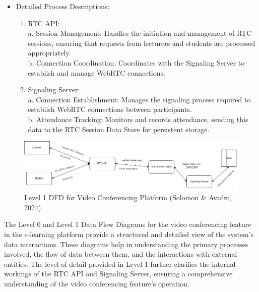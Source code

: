 \documentclass[a4paper,12pt]{article}  %
\begin{document}
\begin{itemize}
\begin{enumerate}
            \end{enumerate}
      \item Detailed Process Descriptions:\\
            \begin{enumerate}
                  \item RTC API:\\
                        a. Session Management: Handles the initiation and management of RTC sessions, ensuring that requests from lecturers and students are processed appropriately.\\
                        b. Connection Coordination: Coordinates with the Signaling Server to establish and manage WebRTC connections.\\
                  \item Signaling Server:\\
                        a. Connection Establishment: Manages the signaling process required to establish WebRTC connections between participants.\\
                        b. Attendance Tracking: Monitors and records attendance, sending this data to the RTC Session Data Store for persistent storage.\\
            \end{enumerate}
\end{itemize}

\begin{figure}[H]
      \centering
      \includegraphics[width=1\textwidth]{figures/dataflow-level1.drawio.png}
      \caption{Level 1 DFD for Video Conferencing Platform (Solomon \& Avadzi, 2024)}
\end{figure}

The Level 0 and Level 1 Data Flow Diagrams for the video conferencing feature in the e-learning platform provide a structured and detailed view of the system's data interactions. These diagrams help in understanding the primary processes involved, the flow of data between them, and the interactions with external entities. The level of detail provided in Level 1 further clarifies the internal workings of the RTC API and Signaling Server, ensuring a comprehensive understanding of the video conferencing feature's operation.\\
\end{document}

